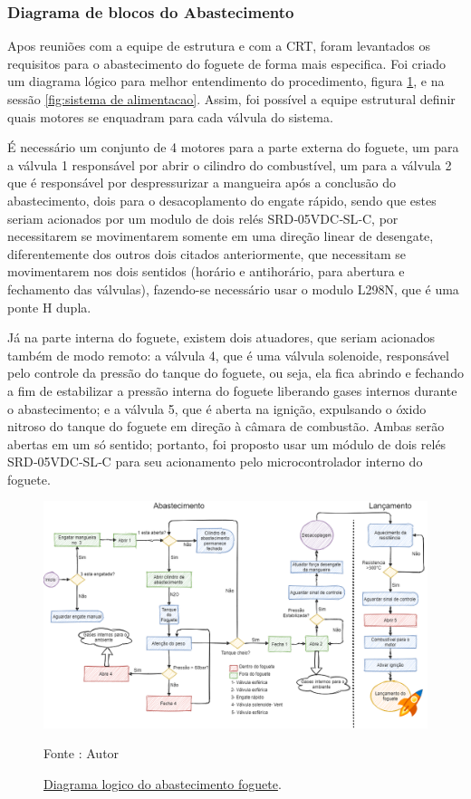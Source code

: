 \subsubsection{Diagrama de blocos do Abastecimento}
\par Apos reuniões com a equipe de estrutura e com a CRT, foram levantados os requisitos para o abastecimento do foguete de forma mais especifica. Foi criado um diagrama lógico para melhor entendimento do procedimento, figura \ref{fig:Abastecimento do fohuete}, e na sessão \ref{fig:sistema de alimentacao}. Assim, foi possível a equipe estrutural definir quais motores se enquadram para cada válvula do sistema.
\par É necessário um conjunto de 4 motores para a parte externa do foguete, um para a válvula 1 responsável por abrir o cilindro do combustível, um para a válvula 2 que é responsável por despressurizar a mangueira após a conclusão do abastecimento, dois para o desacoplamento do engate rápido, sendo que estes seriam acionados por um modulo de dois relés SRD‑05VDC‑SL‑C, por necessitarem se movimentarem somente em uma direção linear de desengate, diferentemente dos outros dois citados anteriormente, que necessitam se movimentarem nos dois sentidos (horário e antihorário, para abertura e fechamento das válvulas), fazendo-se necessário usar o modulo L298N, que é uma ponte H dupla.  
\par Já na parte interna do foguete, existem dois atuadores, que seriam acionados também de modo remoto: a válvula 4, que é uma válvula solenoide, responsável pelo controle da pressão do tanque do foguete, ou seja, ela fica abrindo e fechando a fim de estabilizar a pressão interna do foguete liberando gases internos durante o abastecimento; e a válvula 5, que é aberta na ignição, expulsando o óxido nitroso do tanque do foguete em direção à câmara de combustão. Ambas serão abertas em um só sentido; portanto, foi proposto usar um módulo de dois relés SRD‑05VDC‑SL‑C para seu acionamento pelo microcontrolador interno do foguete.
     


\begin{figure}[H]
  \centering
  \includegraphics[scale=0.3]{figuras/abastecimento -Page-2 (2).png}
  \caption{ \href{https://drive.google.com/file/d/1EhMWyoD2Ml5I2vsLA0MbNOR8LxuCMmC5/view?usp=sharing}{ Diagrama logico do abastecimento foguete}. } 
  {\footnotesize Fonte : Autor } 
  \label{fig:Abastecimento do fohuete}
\end{figure}


